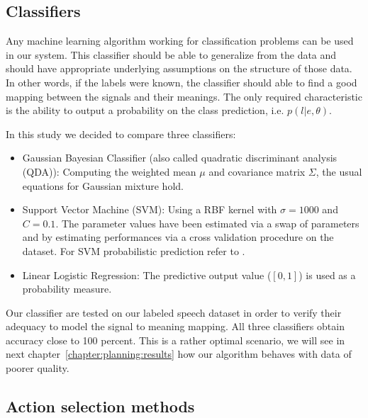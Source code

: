 \subsection{Classifiers}

Any machine learning algorithm working for classification problems can be used in our system. This classifier should be able to generalize from the data and should have appropriate underlying assumptions on the structure of those data. In other words, if the labels were known, the classifier should able to find a good mapping between the signals and their meanings. The only required characteristic is the ability to output a probability on the class prediction, i.e. $p(l|e, \theta)$.

In this study we decided to compare three classifiers:
\begin{itemize}
\item Gaussian Bayesian Classifier (also called quadratic discriminant analysis (QDA)): Computing the weighted mean $\mu$ and covariance matrix $\Sigma$, the usual equations for Gaussian mixture hold.
\item Support Vector Machine (SVM): Using a RBF kernel with $\sigma = 1000$ and $C = 0.1$. The parameter values have been estimated via a swap of parameters and by estimating performances via a cross validation procedure on the dataset. For SVM probabilistic prediction refer to \cite{platt1999probabilistic}.
\item Linear Logistic Regression: The predictive output value ($[0,1]$) is used as a probability measure.
\end{itemize}

Our classifier are tested on our labeled speech dataset in order to verify their adequacy to model the signal to meaning mapping. All three classifiers obtain accuracy close to 100 percent. This is a rather optimal scenario, we will see in next chapter~\ref{chapter:planning:results} how our algorithm behaves with data of poorer quality.

\subsection{Action selection methods}


